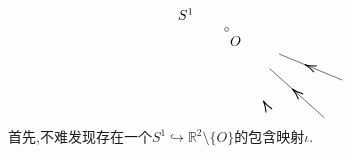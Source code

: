\documentclass{article}
\begin{document}
\begin{example}
\[\begin{tikzpicture}[x=0.75pt,y=0.75pt,yscale=-1,xscale=1]
\draw [shift={(206.31,169.15)}, rotate = 59.74] [color={rgb, 255:red, 0; green, 0; blue, 0 }  ][line width=0.75]    (10.93,-3.29) .. controls (6.95,-1.4) and (3.31,-0.3) .. (0,0) .. controls (3.31,0.3) and (6.95,1.4) .. (10.93,3.29)   ;
\draw    (264.33,185.33) -- (212.33,138.33) ;
\draw [shift={(233.88,157.81)}, rotate = 42.11] [color={rgb, 255:red, 0; green, 0; blue, 0 }  ][line width=0.75]    (10.93,-3.29) .. controls (6.95,-1.4) and (3.31,-0.3) .. (0,0) .. controls (3.31,0.3) and (6.95,1.4) .. (10.93,3.29)   ;
\draw    (281.33,149.33) -- (221.33,124.33) ;
\draw [shift={(245.79,134.53)}, rotate = 22.62] [color={rgb, 255:red, 0; green, 0; blue, 0 }  ][line width=0.75]    (10.93,-3.29) .. controls (6.95,-1.4) and (3.31,-0.3) .. (0,0) .. controls (3.31,0.3) and (6.95,1.4) .. (10.93,3.29)   ;
\draw   (169.61,100.87) .. controls (169.61,99.84) and (170.44,99.01) .. (171.47,99.01) .. controls (172.49,99.01) and (173.32,99.84) .. (173.32,100.87) .. controls (173.32,101.89) and (172.49,102.72) .. (171.47,102.72) .. controls (170.44,102.72) and (169.61,101.89) .. (169.61,100.87) -- cycle ;

\draw (173.47,106.12) node [anchor=north west][inner sep=0.75pt]    {$O$};
\draw (124,79.4) node [anchor=north west][inner sep=0.75pt]    {$S^{1}$};
\end{tikzpicture}\]
    首先,不难发现存在一个$S^1 \hookrightarrow \mathbb{R}^2 \setminus\{O\}$的包含映射$\iota$.



\end{example}
\end{document}
